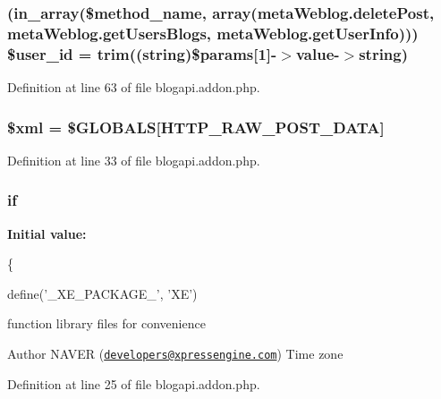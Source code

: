 \subsubsection[{\texorpdfstring{\$user\+\_\+id}{$user_id}}]{ (in\+\_\+array(\$method\+\_\+name, array(\textquotesingle{}meta\+Weblog.\+delete\+Post\textquotesingle{}, \textquotesingle{}meta\+Weblog.\+get\+Users\+Blogs\textquotesingle{}, \textquotesingle{}meta\+Weblog.\+get\+User\+Info\textquotesingle{}))) \${\bf user\+\_\+id} = {\bf trim}((string)\$params\mbox{[}1\mbox{]}-\/$>${\bf value}-\/$>$string)}\hypertarget{blogapi_8addon_8php_a6d0a036129b3030ce289a026c5e1eff2}{}\label{blogapi_8addon_8php_a6d0a036129b3030ce289a026c5e1eff2}


Definition at line 63 of file blogapi.\+addon.\+php.

\subsubsection[{\texorpdfstring{\$xml}{$xml}}]{\setlength{\rightskip}{0pt plus 5cm}\$xml = \$G\+L\+O\+B\+A\+LS\mbox{[}\textquotesingle{}H\+T\+T\+P\+\_\+\+R\+A\+W\+\_\+\+P\+O\+S\+T\+\_\+\+D\+A\+TA\textquotesingle{}\mbox{]}}\hypertarget{blogapi_8addon_8php_aa108d9d91e700ac530401dd363b0723b}{}\label{blogapi_8addon_8php_aa108d9d91e700ac530401dd363b0723b}


Definition at line 33 of file blogapi.\+addon.\+php.

\subsubsection[{\texorpdfstring{if}{if}}]{\setlength{\rightskip}{0pt plus 5cm}if}\hypertarget{blogapi_8addon_8php_ae00067f6d78515f89a86a2a7f42cdc80}{}\label{blogapi_8addon_8php_ae00067f6d78515f89a86a2a7f42cdc80}
{\bfseries Initial value\+:}
\begin{DoxyCode}
\{
    
    define(\textcolor{stringliteral}{'\_XE\_PACKAGE\_'}, \textcolor{stringliteral}{'XE'})
\end{DoxyCode}
function library files for convenience

\begin{DoxyAuthor}{Author}
N\+A\+V\+ER (\href{mailto:developers@xpressengine.com}{\tt developers@xpressengine.\+com}) Time zone 
\end{DoxyAuthor}


Definition at line 25 of file blogapi.\+addon.\+php.

